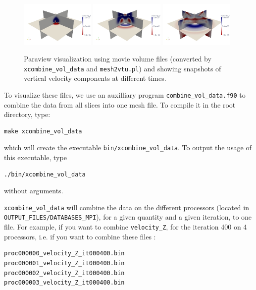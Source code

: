\begin{figure}[htbp]
\begin{centering}
\includegraphics[width=0.32\textwidth]{figures/movie_volume_1.jpg}
\includegraphics[width=0.32\textwidth]{figures/movie_volume_2.jpg}
\includegraphics[width=0.32\textwidth]{figures/movie_volume_3.jpg}
\par
\end{centering}
\caption{Paraview visualization using movie volume files (converted by \texttt{xcombine\_vol\_data}
and \texttt{mesh2vtu.pl}) and showing snapshots of vertical velocity
components at different times.}
\label{fig:movie.volume}
\end{figure}


To visualize these files, we use an auxilliary program \texttt{combine\_vol\_data.f90}
to combine the data from all slices into one mesh file. To compile
it in the root directory, type:

{\footnotesize
\begin{verbatim}
make xcombine_vol_data
\end{verbatim}
}
\noindent
which will create the executable \texttt{bin/xcombine\_vol\_data}.
To output the usage of this executable, type

{\footnotesize
\begin{verbatim}
./bin/xcombine_vol_data
\end{verbatim}
}
\noindent
without arguments.

\medskip

\texttt{xcombine\_vol\_data} will combine the data on the different processors (located in \texttt{OUTPUT\_FILES/DATABASES\_MPI}), for a given quantity and a given iteration, to one file. For example, if you want to combine \texttt{velocity\_Z}, for the iteration 400 on 4 processors, i.e. if you want to combine these files :
{\small
\begin{verbatim}
proc000000_velocity_Z_it000400.bin
proc000001_velocity_Z_it000400.bin
proc000002_velocity_Z_it000400.bin
proc000003_velocity_Z_it000400.bin
\end{verbatim}
}

